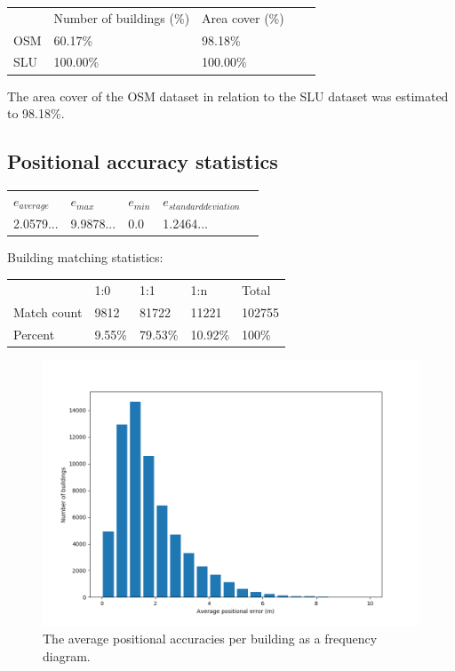 \documentclass[a4paper]{article}
\begin{document}
\begin{table}[H]
\begin{tabular}{lllll}
    & Number of buildings (\%) & Area cover (\%) \\
    OSM & 60.17\% & 98.18\% \\
    SLU & 100.00\% & 100.00\%
\end{tabular}
\end{table}

The area cover of the OSM dataset in relation to the SLU dataset was estimated to 98.18\%.

\subsection{Positional accuracy statistics}

\begin{table}[H]
\begin{tabular}{lllll}
    $e_{average}$ & $e_{max}$ & $e_{min}$ & $e_{standard deviation}$ \\
    2.0579... & 9.9878... & 0.0 & 1.2464...
\end{tabular}
\end{table}

Building matching statistics:

\begin{table}[H]
\begin{tabular}{lllll}
    & 1:0 & 1:1 & 1:n & Total \\
    Match count & 9812   & 81722   & 11221   & 102755 \\
    Percent     & 9.55\% & 79.53\% & 10.92\% & 100\%
\end{tabular}
\end{table}


\begin{figure}[H]
    \centering
    \includegraphics[width=\textwidth,height=0.5\textheight,keepaspectratio]{img_pos_error_plot}
    \caption{The average positional accuracies per building as a frequency diagram.}
    \label{fig:space}
\end{figure}
\end{document}
